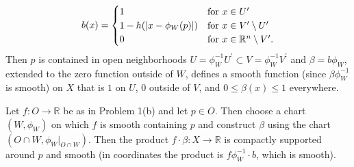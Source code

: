\documentclass[11pt,leqno]{article}
\theoremstyle{plain}
\theoremstyle{definition}
\numberwithin{equation}{section}
\numberwithin{lem}{section}
\begin{document}
\begin{enumerate}
    \[b(x) = \begin{cases}
      1 & \text{for }x\in U^\prime\\
      1-h(\abs{x-\phi_W(p)}) & \text{for }x\in V^\prime\setminus U^\prime\\
      0 & \text{for } x\in \mathbb R^n\setminus V^\prime.
    \end{cases}\]
    Then $p$ is contained in open neighborhoods $U = \phi_W^{-1}U^\prime\subset V = \phi_W^{-1}V^\prime$ and $\beta = b\phi_W$, extended to the zero function outside of $W$, defines a smooth function (since $\beta\phi_W^{-1}$ is smooth) on $X$ that is $1$ on $U$, $0$ outside of $V$, and $0\leq \beta(x)\leq 1$ everywhere. 

    Let $f\colon O\to \mathbb R$ be as in Problem 1(b) and let $p\in O$. Then choose a chart $(W,\phi_W)$ on which $f$ is smooth containing $p$ and construct $\beta$ using the chart $(O\cap W,\phi_W|_{O\cap W})$. Then the product $f\cdot\beta\colon X\to\mathbb R$ is compactly supported around $p$ and smooth (in coordinates the product is $f\phi_W^{-1}\cdot b$, which is smooth).
\end{enumerate}
\end{document}
